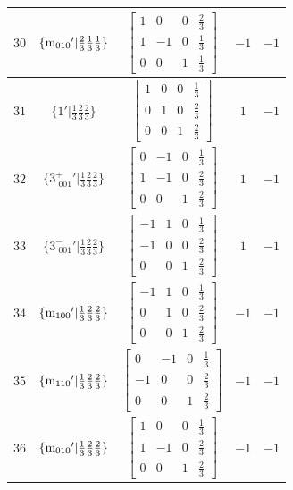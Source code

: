 \documentclass[fleqn,8pt]{jsarticle}
\begin{document}
\begin{longtable}{ccccc}
$ 30 $ & $ \{{\rm m}_{010}{}'|\frac{2}{3} \frac{1}{3} \frac{1}{3}\} $ & $ \begin{bmatrix} 1 & 0 & 0 & \frac{2}{3} \\ 1 & -1 & 0 & \frac{1}{3} \\ 0 & 0 & 1 & \frac{1}{3} \end{bmatrix} $ & $ -1 $ & $ -1 $ \\ \hline
$ 31 $ & $ \{1{}'|\frac{1}{3} \frac{2}{3} \frac{2}{3}\} $ & $ \begin{bmatrix} 1 & 0 & 0 & \frac{1}{3} \\ 0 & 1 & 0 & \frac{2}{3} \\ 0 & 0 & 1 & \frac{2}{3} \end{bmatrix} $ & $ 1 $ & $ -1 $ \\ \hline
$ 32 $ & $ \{3^{+}_{\,\,001}{}'|\frac{1}{3} \frac{2}{3} \frac{2}{3}\} $ & $ \begin{bmatrix} 0 & -1 & 0 & \frac{1}{3} \\ 1 & -1 & 0 & \frac{2}{3} \\ 0 & 0 & 1 & \frac{2}{3} \end{bmatrix} $ & $ 1 $ & $ -1 $ \\ \hline
$ 33 $ & $ \{3^{-}_{\,\,001}{}'|\frac{1}{3} \frac{2}{3} \frac{2}{3}\} $ & $ \begin{bmatrix} -1 & 1 & 0 & \frac{1}{3} \\ -1 & 0 & 0 & \frac{2}{3} \\ 0 & 0 & 1 & \frac{2}{3} \end{bmatrix} $ & $ 1 $ & $ -1 $ \\ \hline
$ 34 $ & $ \{{\rm m}_{100}{}'|\frac{1}{3} \frac{2}{3} \frac{2}{3}\} $ & $ \begin{bmatrix} -1 & 1 & 0 & \frac{1}{3} \\ 0 & 1 & 0 & \frac{2}{3} \\ 0 & 0 & 1 & \frac{2}{3} \end{bmatrix} $ & $ -1 $ & $ -1 $ \\ \hline
$ 35 $ & $ \{{\rm m}_{110}{}'|\frac{1}{3} \frac{2}{3} \frac{2}{3}\} $ & $ \begin{bmatrix} 0 & -1 & 0 & \frac{1}{3} \\ -1 & 0 & 0 & \frac{2}{3} \\ 0 & 0 & 1 & \frac{2}{3} \end{bmatrix} $ & $ -1 $ & $ -1 $ \\ \hline
$ 36 $ & $ \{{\rm m}_{010}{}'|\frac{1}{3} \frac{2}{3} \frac{2}{3}\} $ & $ \begin{bmatrix} 1 & 0 & 0 & \frac{1}{3} \\ 1 & -1 & 0 & \frac{2}{3} \\ 0 & 0 & 1 & \frac{2}{3} \end{bmatrix} $ & $ -1 $ & $ -1 $ \\
\end{longtable}
\end{document}
